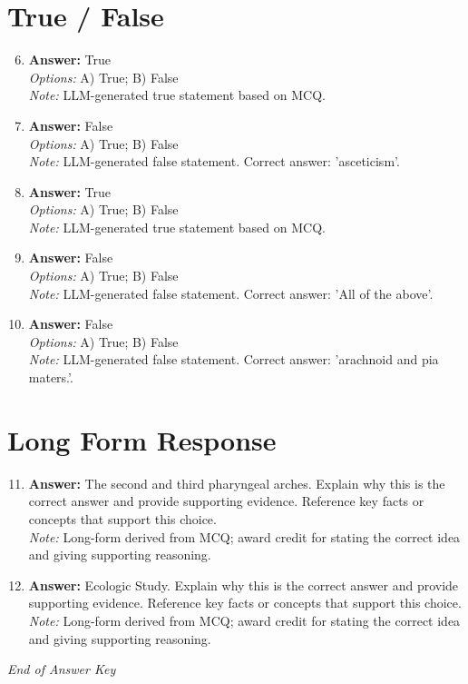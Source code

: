 \documentclass[12pt]{article}
\begin{document}
\section*{True / False}
\begin{enumerate}[label=\arabic*.]
\setcounter{enumi}{5}
\item \textbf{Answer:} True
\\ \textit{Options:} A) True; B) False
\\ \textit{Note:} LLM-generated true statement based on MCQ.
\item \textbf{Answer:} False
\\ \textit{Options:} A) True; B) False
\\ \textit{Note:} LLM-generated false statement. Correct answer: 'asceticism'.
\item \textbf{Answer:} True
\\ \textit{Options:} A) True; B) False
\\ \textit{Note:} LLM-generated true statement based on MCQ.
\item \textbf{Answer:} False
\\ \textit{Options:} A) True; B) False
\\ \textit{Note:} LLM-generated false statement. Correct answer: 'All of the above'.
\item \textbf{Answer:} False
\\ \textit{Options:} A) True; B) False
\\ \textit{Note:} LLM-generated false statement. Correct answer: 'arachnoid and pia maters.'.
\end{enumerate}

\section*{Long Form Response}
\begin{enumerate}[label=\arabic*.]
\setcounter{enumi}{10}
\item \textbf{Answer:} The second and third pharyngeal arches. Explain why this is the correct answer and provide supporting evidence. Reference key facts or concepts that support this choice.
\\ \textit{Note:} Long-form derived from MCQ; award credit for stating the correct idea and giving supporting reasoning.
\item \textbf{Answer:} Ecologic Study. Explain why this is the correct answer and provide supporting evidence. Reference key facts or concepts that support this choice.
\\ \textit{Note:} Long-form derived from MCQ; award credit for stating the correct idea and giving supporting reasoning.
\end{enumerate}

\vfill
\noindent\textit{End of Answer Key}
\end{document}
